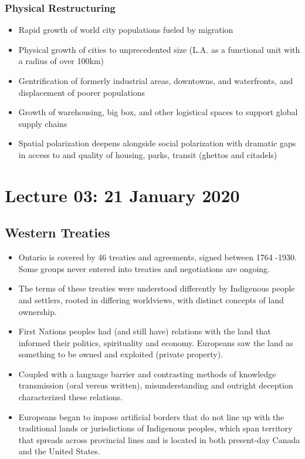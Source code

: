 \documentclass[11pt]{article}
\begin{document}
\subsubsection{Physical Restructuring}
\begin{itemize}
\item Rapid growth of world city populations fueled by migration
\item Physical growth of cities to unprecedented size (L.A. as a functional unit with a radius of over 100km)
\item Gentrification of formerly industrial areas, downtowns, and waterfronts, and displacement of poorer populations
\item Growth of warehousing, big box, and other logistical spaces to support global supply chains
\item Spatial polarization deepens alongside social polarization with dramatic gaps in access to and quality of housing, parks, transit (ghettos and citadels)
\end{itemize}


\section{Lecture 03: 21 January 2020}

\subsection{Western Treaties}
\begin{itemize}
\item Ontario is covered by 46 treaties and agreements, signed between 1764 -1930. Some
groups never entered into treaties and negotiations are ongoing.
\item The terms of these treaties were understood differently by Indigenous people and settlers,
rooted in differing worldviews, with distinct concepts of land ownership.
\item First Nations peoples had (and still have) relations with the land that informed their
politics, spirituality and economy. Europeans saw the land as something to be owned and
exploited (private property).
\item Coupled with a language barrier and contrasting methods of knowledge transmission (oral
versus written), misunderstanding and outright deception characterized these relations.
\item Europeans began to impose artificial borders that do not line up with the traditional lands
or jurisdictions of Indigenous peoples, which span territory that spreads across provincial
lines and is located in both present-day Canada and the United States. 
\end{itemize}
\end{document}
